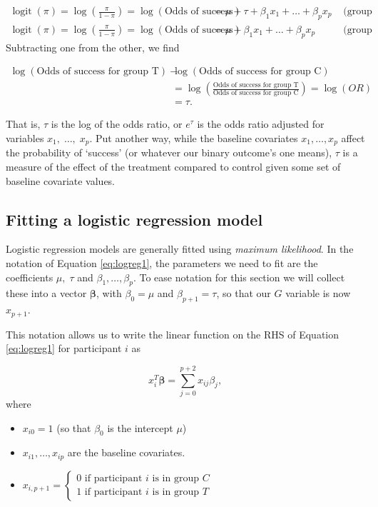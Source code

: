 \documentclass[
  openany]{book}
\providecommand{\tightlist}{%
  \setlength{\itemsep}{0pt}\setlength{\parskip}{0pt}}
\theoremstyle{definition}
\theoremstyle{definition}
\theoremstyle{definition}
\theoremstyle{definition}
\theoremstyle{remark}
\begin{document}
\[
\begin{aligned}
\operatorname{logit}\left(\pi\right) = \log\left(\frac{\pi}{1-\pi}\right) = \log\left(\text{Odds of success}\right) & = \mu + \tau + \beta_1x_1 + \ldots + \beta_px_p & \text{ (group T)}\\
\operatorname{logit}\left(\pi\right) = \log\left(\frac{\pi}{1-\pi}\right) = \log\left(\text{Odds of success}\right) & = \mu + \beta_1x_1 + \ldots + \beta_px_p & \text{ (group C)}
\end{aligned}
\]
Subtracting one from the other, we find

\[
\begin{aligned}
\log(\text{Odds of success for group T}) - & \log(\text{Odds of success for group C})\\
&= 
\log\left(\frac{\text{Odds of success for group T}}{\text{Odds of success for group C}}\right) = \log\left(OR\right) \\
&= \tau.
\end{aligned}
\]

That is, \(\tau\) is the log of the odds ratio, or \(e^\tau\) is the odds ratio adjusted for variables \(x_1,\;\ldots,\;x_p\). Put another way, while the baseline covariates \(x_1,\ldots,x_p\) affect the probability of `success' (or whatever our binary outcome's one means), \(\tau\) is a measure of the effect of the treatment compared to control given some set of baseline covariate values.

\subsection{Fitting a logistic regression model}\label{fitting-a-logistic-regression-model}

Logistic regression models are generally fitted using \emph{maximum likelihood}. In the notation of Equation \eqref{eq:logreg1}, the parameters we need to fit are the coefficients \(\mu,\;\tau\) and \(\beta_1,\ldots,\beta_p\). To ease notation for this section we will collect these into a vector \(\boldsymbol\beta\), with \(\beta_0=\mu\) and \(\beta_{p+1}=\tau\), so that our \(G\) variable is now \(x_{p+1}\).

This notation allows us to write the linear function on the RHS of Equation \eqref{eq:logreg1} for participant \(i\) as

\[x_i^T\boldsymbol\beta = \sum\limits_{j=0}^{p+2} x_{ij}\beta_j, \]
where

\begin{itemize}
\tightlist
\item
  \(x_{i0}=1\) (so that \(\beta_0\) is the intercept \(\mu\))
\item
  \(x_{i1},\ldots,x_{ip}\) are the baseline covariates.
\item
  \(x_{i,p+1}=
    \begin{cases}
    0\text{ if participant }i\text{ is in group }C\\
    1\text{ if participant }i\text{ is in group }T
    \end{cases}\)
\end{itemize}
\end{document}
